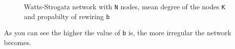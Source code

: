 \documentclass[a4paper]{article}
\theoremstyle{definition}
\begin{document}
\begin{figure}[H]
  \centering
  \hspace{1em}
  \hspace{1em}
  \caption{Watts-Strogatz network with \texttt{N} nodes, mean degree of the
  nodes \texttt{K} and propabilty of rewiring \texttt{b}}
  \label{fig:watts-strogatz-networks}
\end{figure}

As you can see the higher the value of \texttt{b} is, the more irregular the
network becomes.

\newpage
\end{document}
